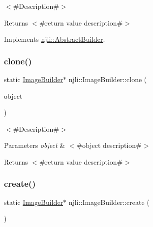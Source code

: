 $<$\#\+Description\#$>$

\begin{DoxyReturn}{Returns}
$<$\#return value description\#$>$ 
\end{DoxyReturn}


Implements \mbox{\hyperlink{classnjli_1_1_abstract_builder_aa1d220053e182c37b31b427499c6eacf}{njli\+::\+Abstract\+Builder}}.

\mbox{\label{classnjli_1_1_image_builder_a201a60e9735869bf1912babb646fb9f3}} 
\subsubsection{\texorpdfstring{clone()}{clone()}}
{\footnotesize\ttfamily static \mbox{\hyperlink{classnjli_1_1_image_builder}{Image\+Builder}}$\ast$ njli\+::\+Image\+Builder\+::clone (\begin{DoxyParamCaption}\item[{const \mbox{\hyperlink{classnjli_1_1_image_builder}{Image\+Builder}} \&}]{object }\end{DoxyParamCaption})\hspace{0.3cm}{\ttfamily [static]}}

$<$\#\+Description\#$>$


\begin{DoxyParams}{Parameters}
{\em object} & $<$\#object description\#$>$\\
\hline
\end{DoxyParams}
\begin{DoxyReturn}{Returns}
$<$\#return value description\#$>$ 
\end{DoxyReturn}
\mbox{\label{classnjli_1_1_image_builder_a22ef7a57c5a968e60e1b667d84ff0ca9}} 
\subsubsection{\texorpdfstring{create()}{create()}}
{\footnotesize\ttfamily static \mbox{\hyperlink{classnjli_1_1_image_builder}{Image\+Builder}}$\ast$ njli\+::\+Image\+Builder\+::create (\begin{DoxyParamCaption}{ }\end{DoxyParamCaption})\hspace{0.3cm}{\ttfamily [static]}}

